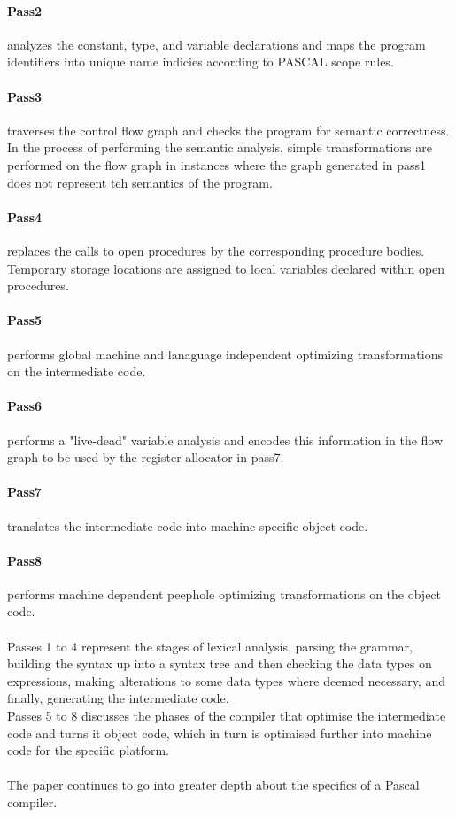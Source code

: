 \documentclass[12pt]{report}
\begin{document}
\paragraph{Pass2} analyzes the constant, type, and variable declarations and maps the program identifiers into unique name indicies according to PASCAL scope rules.
\paragraph{Pass3} traverses the control flow graph and checks the program for semantic correctness.  In the process of performing the semantic analysis, simple transformations are performed on the flow graph in instances where the graph generated in pass1 does not represent teh semantics of the program.
\paragraph{Pass4} replaces the calls to open procedures by the corresponding procedure bodies.  Temporary storage locations are assigned to local variables declared within open procedures.
\paragraph{Pass5} performs global machine and lanaguage independent optimizing transformations on the intermediate code.
\paragraph{Pass6} performs a "live-dead" variable analysis and encodes this information in the flow graph to be used by the register allocator in pass7.
\paragraph{Pass7} translates the intermediate code into machine specific object code.
\paragraph{Pass8} performs machine dependent peephole optimizing transformations on the object code. \citep{compilercodegeneration79}\\
\\
Passes 1 to 4 represent the stages of lexical analysis, parsing the grammar, building the syntax up into a syntax tree and then checking the data types on expressions, making alterations to some data types where deemed necessary, and finally, generating the intermediate code.
\\
Passes 5 to 8 discusses the phases of the compiler that optimise the intermediate code and turns it object code, which in turn is optimised further into machine code for the specific platform.\\
\\
The paper continues to go into greater depth about the specifics of a Pascal compiler.
\end{document}

